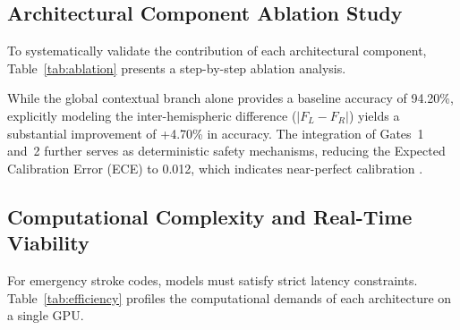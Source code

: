 \documentclass[conference]{IEEEtran}
\begin{document}
\subsection{Architectural Component Ablation Study}
To systematically validate the contribution of each architectural component, Table~\ref{tab:ablation} presents a step-by-step ablation analysis.

\begin{table}[htbp]
\caption{Systematic Ablation Study of NeuroScan Structural Modules}
\vspace{-2mm}
\label{tab:ablation}
\centering
{}
\end{table}

While the global contextual branch alone provides a baseline accuracy of 94.20\%, explicitly modeling the inter-hemispheric difference ($|F_L-F_R|$) yields a substantial improvement of +4.70\% in accuracy. The integration of Gates~1 and~2 further serves as deterministic safety mechanisms, reducing the Expected Calibration Error (ECE) to 0.012, which indicates near-perfect calibration \cite{b13}.

\subsection{Computational Complexity and Real-Time Viability}
For emergency stroke codes, models must satisfy strict latency constraints. Table~\ref{tab:efficiency} profiles the computational demands of each architecture on a single GPU.
\end{document}
